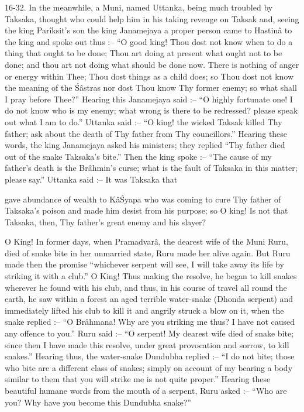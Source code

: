 16-32. In the meanwhile, a Muni, named Uttanka, being much troubled by Taksaka, thought who could help him in his taking revenge on Taksak and, seeing the king Par\^iksit's son the king Janamejaya a proper person came to Hastin\^a to the king and spoke out thus :-- ``O good king! Thou dost not know when to do a thing that ought to be done; Thou art doing at present what ought not to be done; and thou art not doing what should be done now. There is nothing of anger or energy within Thee; Thou dost things as a child does; so Thou dost not know the meaning of the \'S\^astras nor dost Thou know Thy former enemy; so what shall I pray before Thee?''  Hearing this Janamejaya said :-- ``O highly fortunate one! I do not know who is my enemy; what wrong is there to be redressed? please speak out what I am to do.'' Uttanka said :-- ``O king! the wicked Taksak killed Thy father; ask about the death of Thy father from Thy councillors.'' Hearing these words, the king Janamejaya asked his ministers; they replied ``Thy father died out of the snake Taksaka's bite.'' Then the king spoke :-- ``The cause of my father's death is the Br\^ahmin's curse; what is the fault of Taksaka in this matter; please say.'' Uttanka said :-- It was Taksaka that

gave abundance of wealth to K\^a\'Syapa who was coming to cure Thy father of Taksaka's poison and made him desist from his purpose; so O king! Is not that Taksaka, then, Thy father's great enemy and his slayer?

O King! In former days, when Pramadvar\^a, the dearest wife of the Muni Ruru, died of snake bite in her unmarried state, Ruru made her alive again. But Ruru made then the promise ``whichever serpent will see, I will take away its life by striking it with a club.'' O King! Thus making the resolve, he began to kill snakes wherever he found with his club, and thus, in his course of travel all round the earth, he saw within a forest an aged terrible water-snake (Dhonda serpent) and immediately lifted his club to kill it and angrily struck a blow on it, when the snake replied :-- ``O Br\^ahmana! Why are you striking me thus? I have not caused any offence to you.'' Ruru said :-- ``O serpent! My dearest wife died of snake bite; since then I have made this resolve, under great provocation and sorrow, to kill snakes.'' Hearing thus, the water-snake Dundubha replied :-- ``I do not bite; those who bite are a different class of snakes; simply on account of my bearing a body similar to them that you will strike me is not quite proper.'' Hearing these beautiful humane words from the mouth of a serpent, Ruru asked :-- ``Who are you? Why have you become this Dundubha snake?''

